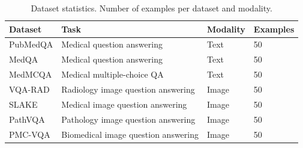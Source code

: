 \begin{table}[t]
\centering
\small
\setlength{\tabcolsep}{4pt}
\renewcommand{\arraystretch}{1.13}
\caption{Dataset statistics. Number of examples per dataset and modality.}
\label{tab:dataset_stats}
\begin{tabular*}{\textwidth}{@{\extracolsep{\fill}}llll@{}}
\toprule
\textbf{Dataset} & \textbf{Task} & \textbf{Modality} & \textbf{Examples} \\
\midrule
PubMedQA & Medical question answering & Text & 50 \\
MedQA & Medical question answering & Text & 50 \\
MedMCQA & Medical multiple-choice QA & Text & 50 \\
VQA-RAD & Radiology image question answering & Image & 50 \\
SLAKE & Medical image question answering & Image & 50 \\
PathVQA & Pathology image question answering & Image & 50 \\
PMC-VQA & Biomedical image question answering & Image & 50 \\
\bottomrule
\end{tabular*}
\end{table}
